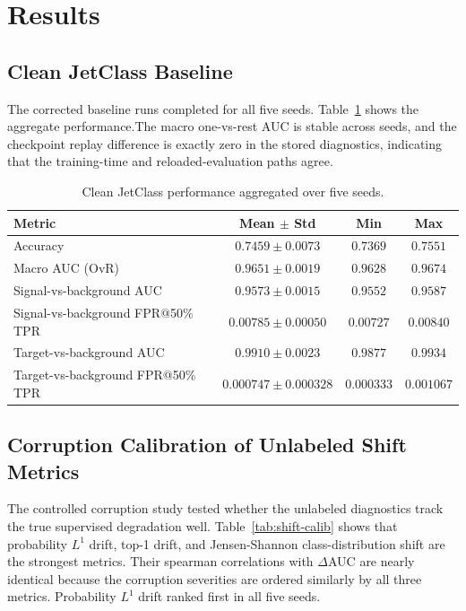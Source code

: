 \section{Results}
\label{sec:results}

\subsection{Clean JetClass Baseline}

The corrected baseline runs completed for all five seeds. Table~\ref{tab:clean-aggregate} shows the aggregate performance.The macro one-vs-rest AUC is stable across seeds, and the checkpoint replay difference is exactly zero in the stored diagnostics, indicating that the training-time and reloaded-evaluation paths agree.


\begin{table}[t]
\centering
\caption{Clean JetClass performance aggregated over five seeds.}
\label{tab:clean-aggregate}
\begin{tabular}{lccc}
\toprule
Metric & Mean $\pm$ Std & Min & Max \\
\midrule
Accuracy & $0.7459 \pm 0.0073$ & $0.7369$ & $0.7551$ \\
Macro AUC (OvR) & $0.9651 \pm 0.0019$ & $0.9628$ & $0.9674$ \\
Signal-vs-background AUC & $0.9573 \pm 0.0015$ & $0.9552$ & $0.9587$ \\
Signal-vs-background FPR@50\% TPR & $0.00785 \pm 0.00050$ & $0.00727$ & $0.00840$ \\
Target-vs-background AUC & $0.9910 \pm 0.0023$ & $0.9877$ & $0.9934$ \\
Target-vs-background FPR@50\% TPR & $0.000747 \pm 0.000328$ & $0.000333$ & $0.001067$ \\
\bottomrule
\end{tabular}
\end{table}

\subsection{Corruption Calibration of Unlabeled Shift Metrics}

The controlled corruption study tested whether the unlabeled diagnostics track the true supervised degradation well. Table~\ref{tab:shift-calib} shows that probability $L^1$ drift, top-1 drift, and Jensen-Shannon class-distribution shift are the strongest metrics. Their spearman correlations with $\Delta$AUC are nearly identical because the corruption severities are ordered similarly by all three metrics. Probability $L^1$ drift ranked first in all five seeds.

